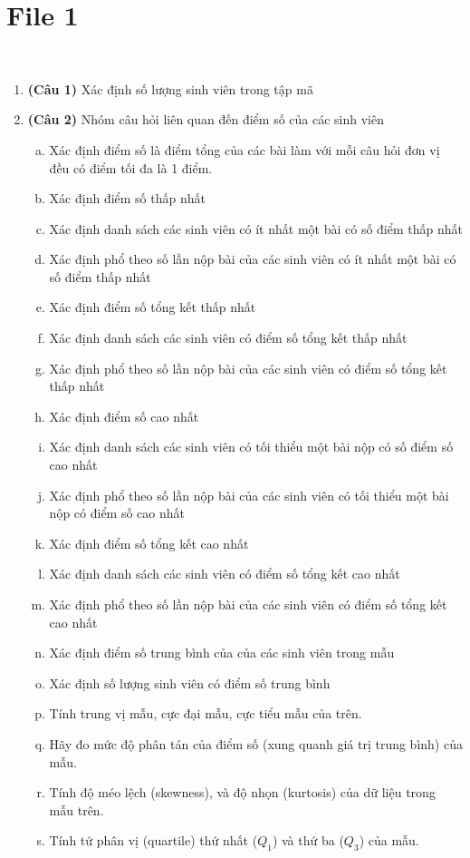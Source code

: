 \documentclass[12pt,a4paper]{article}  %
\begin{document}
\section{File 1} \
\begin{enumerate}
\item {\textbf{(Câu 1)} Xác định số lượng sinh viên trong tập mã}
    
\item {\textbf{(Câu 2)} Nhóm câu hỏi liên quan đến điểm số của các sinh viên }
\begin{enumerate}[a)]
  \item {Xác định điểm số là điểm tổng của các bài làm với mỗi câu hỏi đơn vị đều có điểm tối đa là 1 điểm.}

  \item {Xác định điểm số thấp nhất}
  \item {Xác định danh sách các sinh viên có ít nhất một bài có số điểm thấp nhất}
  \item {Xác định phổ theo số lần nộp bài của các sinh viên có ít nhất một bài có số điểm thấp nhất}
    
  \item {Xác định điểm số tổng kết thấp nhất}
  \item {Xác định danh sách các sinh viên có điểm số tổng kết thấp nhất}
  \item {Xác định phổ theo số lần nộp bài của các sinh viên có điểm số tổng kết thấp nhất}
    
  \item {Xác định điểm số cao nhất}
  \item {Xác định danh sách các sinh viên có tối thiểu một bài nộp có số điểm số cao nhất}
  \item {Xác định phổ theo số lần nộp bài của các sinh viên có tối thiểu một bài nộp có điểm số cao nhất}
    
  \item {Xác định điểm số tổng kết cao nhất}
  \item {Xác định danh sách các sinh viên có điểm số tổng kết cao nhất}
  \item {Xác định phổ theo số lần nộp bài của các sinh viên có điểm số tổng kết cao nhất}
  
  \item Xác định điểm số trung bình của của các sinh viên trong mẫu
  \item Xác định số lượng sinh viên có điểm số trung bình 
  \item Tính trung vị mẫu, cực đại mẫu, cực tiểu mẫu của trên.
  \item Hãy đo mức độ phân tán của điểm số (xung quanh giá trị trung bình) của  mẫu.
  \item Tính độ méo lệch (skewness), và độ nhọn (kurtosis) của dữ liệu trong mẫu trên.
  \item Tính tứ phân vị (quartile) thứ nhất ($Q_1$) và thứ ba ($Q_3$) của mẫu.
  

\end{enumerate}
\end{enumerate}
\end{document}
